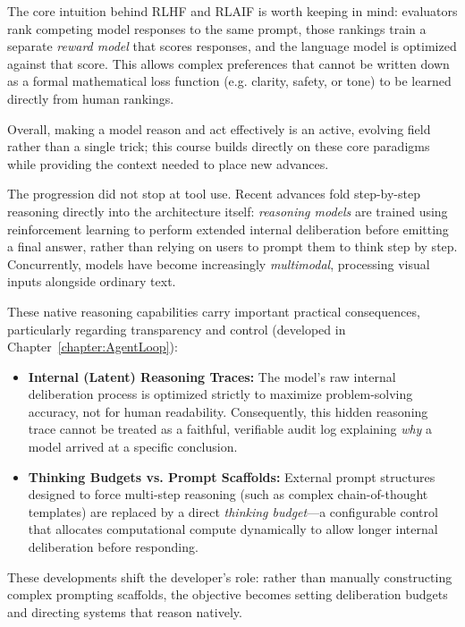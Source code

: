 The core intuition behind RLHF and RLAIF is worth keeping in mind: evaluators rank competing model responses to the same prompt, those rankings train a separate \emph{reward model} that scores responses, and the language model is optimized against that score.
This allows complex preferences that cannot be written down as a formal mathematical loss function (e.g. clarity, safety, or tone) to be learned directly from human rankings.

Overall, making a model reason and act effectively is an active, evolving field rather than a single trick; this course builds directly on these core paradigms while providing the context needed to place new advances.

The progression did not stop at tool use.
Recent advances fold step-by-step reasoning directly into the architecture itself: \emph{reasoning models} are trained using reinforcement learning to perform extended internal deliberation before emitting a final answer, rather than relying on users to prompt them to think step by step.
Concurrently, models have become increasingly \emph{multimodal}, processing visual inputs alongside ordinary text.

These native reasoning capabilities carry important practical consequences, particularly regarding transparency and control (developed in Chapter~\ref{chapter:AgentLoop}):

\begin{itemize}
    \item \textbf{Internal (Latent) Reasoning Traces:} The model's raw internal deliberation process is optimized strictly to maximize problem-solving accuracy, not for human readability. Consequently, this hidden reasoning trace cannot be treated as a faithful, verifiable audit log explaining \emph{why} a model arrived at a specific conclusion.
    \item \textbf{Thinking Budgets vs. Prompt Scaffolds:} External prompt structures designed to force multi-step reasoning (such as complex chain-of-thought templates) are replaced by a direct \emph{thinking budget}—a configurable control that allocates computational compute dynamically to allow longer internal deliberation before responding.
\end{itemize}

These developments shift the developer's role: rather than manually constructing complex prompting scaffolds, the objective becomes setting deliberation budgets and directing systems that reason natively.



